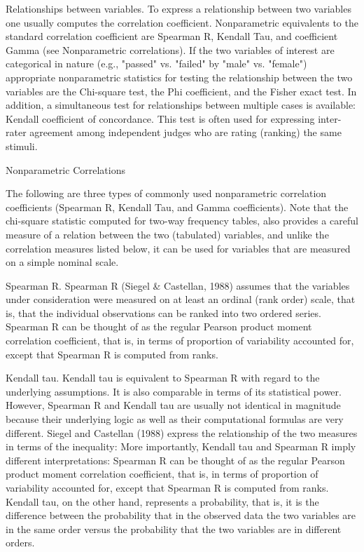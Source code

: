 Relationships between variables. To express a relationship between two variables one usually computes the correlation coefficient. Nonparametric equivalents to the standard correlation coefficient are Spearman R, Kendall Tau, and coefficient Gamma (see Nonparametric correlations). If the two variables of interest are categorical in nature (e.g., "passed" vs. "failed" by "male" vs. "female") appropriate nonparametric statistics for testing the relationship between the two variables are the Chi-square test, the Phi coefficient, and the Fisher exact test. In addition, a simultaneous test for relationships between multiple cases is available: Kendall coefficient of concordance. This test is often used for expressing inter-rater agreement among independent judges who are rating (ranking) the same stimuli.

Nonparametric Correlations

The following are three types of commonly used nonparametric correlation coefficients (Spearman R, Kendall Tau, and Gamma coefficients). Note that the chi-square statistic computed for two-way frequency tables, also provides a careful measure of a relation between the two (tabulated) variables, and unlike the correlation measures listed below, it can be used for variables that are measured on a simple nominal scale.

Spearman R. Spearman R (Siegel & Castellan, 1988) assumes that the variables under consideration were measured on at least an ordinal (rank order) scale, that is, that the individual observations can be ranked into two ordered series. Spearman R can be thought of as the regular Pearson product moment correlation coefficient, that is, in terms of proportion of variability accounted for, except that Spearman R is computed from ranks.

Kendall tau. Kendall tau is equivalent to Spearman R with regard to the underlying assumptions. It is also comparable in terms of its statistical power. However, Spearman R and Kendall tau are usually not identical in magnitude because their underlying logic as well as their computational formulas are very different. Siegel and Castellan (1988) express the relationship of the two measures in terms of the inequality: More importantly, Kendall tau and Spearman R imply different interpretations: Spearman R can be thought of as the regular Pearson product moment correlation coefficient, that is, in terms of proportion of variability accounted for, except that Spearman R is computed from ranks. Kendall tau, on the other hand, represents a probability, that is, it is the difference between the probability that in the observed data the two variables are in the same order versus the probability that the two variables are in different orders.

